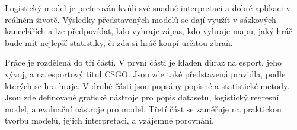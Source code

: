 Logistický model je preferován kvůli své 
{\color{red}
snadné 
}
interpretaci a 
dobré aplikaci v reálném životě. Výsledky
{\color{red}
představených modelů se dají využít v sázkových kancelářích
}
a lze předpovídat, kdo vyhraje zápas, kdo vyhraje mapu, jaký hráč bude mít nejlepší statistiky, či zda si hráč koupí určitou zbraň.

Práce je rozdělená do tří částí. V první části je kladen důraz na esport, jeho vývoj, a na esportový titul \ac{CSGO}. Jsou zde také představená pravidla, podle kterých se
hra hraje. V druhé části jsou popsány popisné a statistické metody. Jsou zde definované grafické nástroje pro popis datasetu, logistický regresní model, a evaluační nástroje
pro model. Třetí část se zaměřuje na praktickou tvorbu modelů, jejich interpretaci, a vzájemné porovnání.
